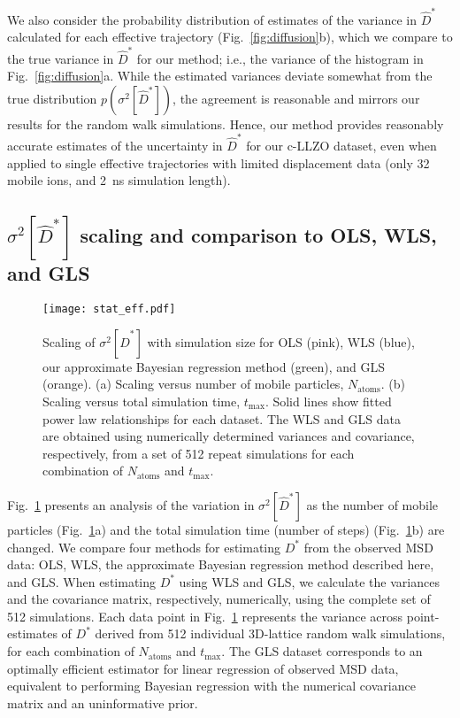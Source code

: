 \documentclass[reprint,superscriptaddress,nobibnotes,amsmath,amssymb,aps,prx,hidelinks,linenumbers]{revtex4-2}
\newcommand{\prob}[1]{\ensuremath{p(#1)}}
\newcommand{\Dest}{\ensuremath{\widehat{D}^*}}
\newcommand{\D}{\ensuremath{D^*}}
\newcommand{\var}[1]{\ensuremath{\sigma^2[#1]}}
\begin{document}
We also consider the probability distribution of estimates of the variance in $\Dest$ calculated for each effective trajectory (Fig.~\ref{fig:diffusion}b), which we compare to the true variance in $\Dest$ for our method; i.e., the variance of the histogram in Fig.~\ref{fig:diffusion}a.
While the estimated variances deviate somewhat from the true distribution $\prob{\var{\Dest}}$, the agreement is reasonable and mirrors our results for the random walk simulations.
Hence, our method provides reasonably accurate estimates of the uncertainty in $\Dest$ for our c-LLZO dataset, even when applied to single effective trajectories with limited displacement data (only 32 mobile ions, and \SI{2}{ns} simulation length).

\subsection{$\var{\Dest}$ scaling and comparison to OLS, WLS, and GLS}

\begin{figure}[htb]
    \centering
    \texttt{[image: stat\_eff.pdf]}
    \caption{
      Scaling of $\var{\Dest}$ with simulation size for OLS (pink), WLS (blue), our approximate Bayesian regression method (green), and GLS (orange).
      (a) Scaling versus number of mobile particles, $N_\mathrm{atoms}$.
      (b) Scaling versus total simulation time, $t_\mathrm{max}$.
      Solid lines show fitted power law relationships for each dataset.
      The WLS and GLS data are obtained using numerically determined variances and covariance, respectively, from a set of \num{512} repeat simulations for each combination of $N_\mathrm{atoms}$ and $t_\mathrm{max}$.
    }
    \label{fig:stat_eff}
\end{figure}

Fig.~\ref{fig:stat_eff} presents an analysis of the variation in $\var{\Dest}$ as the number of mobile particles (Fig.~\ref{fig:stat_eff}a) and the total simulation time (number of steps) (Fig.~\ref{fig:stat_eff}b) are changed.
We compare four methods for estimating $\D$ from the observed MSD data: OLS, WLS, the approximate Bayesian regression method described here, and GLS.
When estimating $\D$ using WLS and GLS, we calculate the variances and the covariance matrix, respectively, numerically, using the complete set of \num{512} simulations.
Each data point in Fig.~\ref{fig:stat_eff} represents the variance across point-estimates of $\D$ derived from \num{512} individual 3D-lattice random walk simulations, for each combination of $N_\mathrm{atoms}$ and $t_\mathrm{max}$.
The GLS dataset corresponds to an optimally efficient estimator for linear regression of observed MSD data, equivalent to performing Bayesian regression with the numerical covariance matrix and an uninformative prior.
\end{document}
